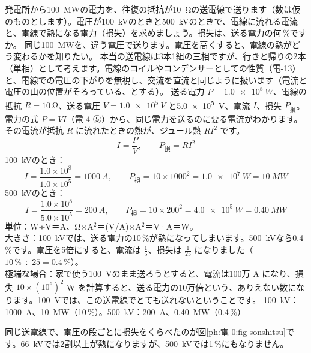 \begin{phreidai}\label{ph:電-0:ex3}
発電所から\qty{100}{MW}の電力を、往復の抵抗が\qty{10}{\ohm}の送電線で送ります（数は仮のものとします）。電圧が\qty{100}{kV}のときと\qty{500}{kV}のときで、電線に流れる電流と、電線で熱になる電力（損失）を求めましょう。損失は、送る電力の何\,\%ですか。
\phbamen
同じ\qty{100}{MW}を、違う電圧で送ります。電圧を高くすると、電線の熱がどう変わるかを知りたい。
\phmushi
本当の送電線は3本1組の三相ですが、行きと帰りの2本（単相）として考えます。電線のコイルやコンデンサーとしての性質（電-13）と、電線での電圧の下がりを無視し、交流を直流と同じように扱います（電流と電圧の山の位置がそろっている、とする）。
\phzu
送る電力 $P=\qty{1.0e8}{W}$、電線の抵抗 $R=\qty{10}{\ohm}$、送る電圧 $V=\qty{1.0e5}{V}$ と\qty{5.0e5}{V}、電流 $I$、損失 $P_{\text{損}}$。
\phriyu
電力の式 $P=VI$（電-4 ⑤）から、同じ電力を送るのに要る電流がわかります。その電流が抵抗 $R$ に流れたときの熱が、ジュール熱 $RI^2$ です。
\phtateru
\[I=\frac{P}{V},\qquad P_{\text{損}}=RI^2\]
\phtoku
\qty{100}{kV}のとき：
\[I=\frac{1.0\times10^8}{1.0\times10^5}=\qty{1000}{A},\qquad P_{\text{損}}=10\times1000^2=\qty{1.0e7}{W}=\qty{10}{MW}\]
\qty{500}{kV}のとき：
\[I=\frac{1.0\times10^8}{5.0\times10^5}=\qty{200}{A},\qquad P_{\text{損}}=10\times200^2=\qty{4.0e5}{W}=\qty{0.40}{MW}\]
\phtashikame
単位：W÷V＝A、Ω×A$^2$＝(V/A)×A$^2$＝V·A＝W。\\
大きさ：\qty{100}{kV}では、送る電力の10\,\%が熱になってしまいます。\qty{500}{kV}なら0.4\,\%です。電圧を5倍にすると、電流は $\tfrac15$、損失は $\tfrac1{25}$ になりました（$10\,\%\div25=0.4\,\%$）。\\
極端な場合：家で使う\qty{100}{V}のまま送ろうとすると、電流は100万 A になり、損失 $10\times(10^6)^2$ W を計算すると、送る電力の10万倍という、ありえない数になります。\qty{100}{V}では、この送電線でとても送れないということです。
\kotae \qty{100}{kV}：\qty{1000}{A}、\qty{10}{MW}（10\,\%）。\qty{500}{kV}：\qty{200}{A}、\qty{0.40}{MW}（0.4\,\%）
\end{phreidai}
\noindent 同じ送電線で、電圧の段ごとに損失をくらべたのが図\ref{ph:電-0:fig-sonshitsu}です。\qty{66}{kV}では2割以上が熱になりますが、\qty{500}{kV}では1\,\%にもなりません。
\begin{bkfigure}
\label{ph:電-0:fig-sonshitsu}
\end{bkfigure}

